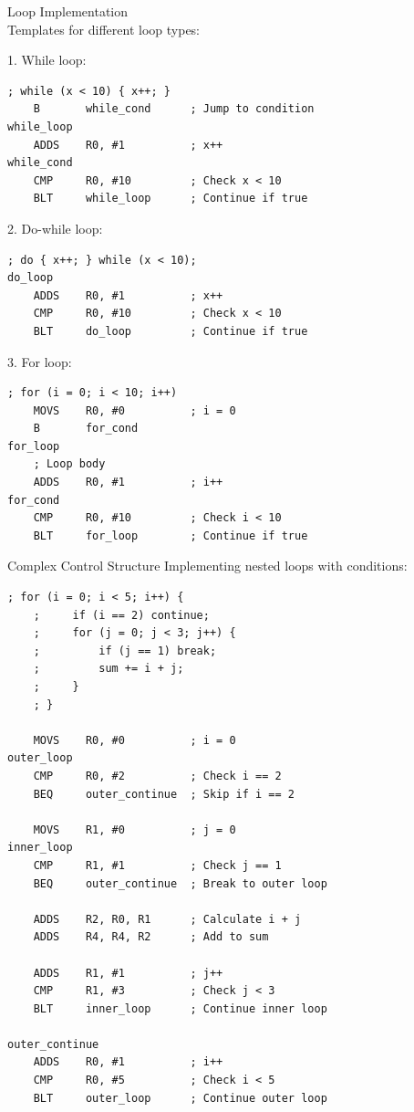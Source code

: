 \begin{KR}{Loop Implementation}\\
Templates for different loop types:

1. While loop:
\begin{lstlisting}[language=armasm, style=basesmol]
    ; while (x < 10) { x++; }
    B       while_cond      ; Jump to condition
while_loop
    ADDS    R0, #1          ; x++
while_cond
    CMP     R0, #10         ; Check x < 10
    BLT     while_loop      ; Continue if true
\end{lstlisting}

2. Do-while loop:
\begin{lstlisting}[language=armasm, style=basesmol]
    ; do { x++; } while (x < 10);
do_loop
    ADDS    R0, #1          ; x++
    CMP     R0, #10         ; Check x < 10
    BLT     do_loop         ; Continue if true
\end{lstlisting}

3. For loop:
\begin{lstlisting}[language=armasm, style=basesmol]
    ; for (i = 0; i < 10; i++)
    MOVS    R0, #0          ; i = 0
    B       for_cond
for_loop
    ; Loop body
    ADDS    R0, #1          ; i++
for_cond
    CMP     R0, #10         ; Check i < 10
    BLT     for_loop        ; Continue if true
\end{lstlisting}
\end{KR}



\begin{example2}{Complex Control Structure}
Implementing nested loops with conditions:
\begin{lstlisting}[language=armasm, style=basesmol]
    ; for (i = 0; i < 5; i++) {
    ;     if (i == 2) continue;
    ;     for (j = 0; j < 3; j++) {
    ;         if (j == 1) break;
    ;         sum += i + j;
    ;     }
    ; }
    
    MOVS    R0, #0          ; i = 0
outer_loop
    CMP     R0, #2          ; Check i == 2
    BEQ     outer_continue  ; Skip if i == 2
    
    MOVS    R1, #0          ; j = 0
inner_loop
    CMP     R1, #1          ; Check j == 1
    BEQ     outer_continue  ; Break to outer loop
    
    ADDS    R2, R0, R1      ; Calculate i + j
    ADDS    R4, R4, R2      ; Add to sum
    
    ADDS    R1, #1          ; j++
    CMP     R1, #3          ; Check j < 3
    BLT     inner_loop      ; Continue inner loop
    
outer_continue
    ADDS    R0, #1          ; i++
    CMP     R0, #5          ; Check i < 5
    BLT     outer_loop      ; Continue outer loop
\end{lstlisting}
\end{example2}



